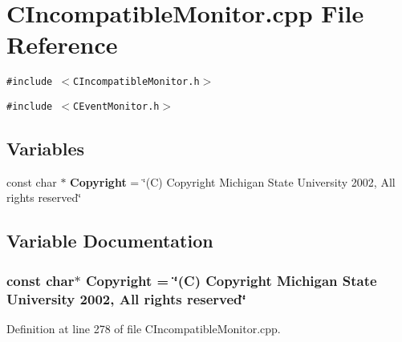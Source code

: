 \section{CIncompatible\-Monitor.cpp File Reference}
\label{CIncompatibleMonitor_8cpp}
{\tt \#include $<$CIncompatible\-Monitor.h$>$}\par
{\tt \#include $<$CEvent\-Monitor.h$>$}\par
\subsection*{Variables}
\begin{CompactItemize}
\item 
const char $\ast$ {\bf Copyright} = \char`\"{}(C) Copyright Michigan State University 2002, All rights reserved\char`\"{}
\end{CompactItemize}


\subsection{Variable Documentation}
\subsubsection{\setlength{\rightskip}{0pt plus 5cm}const char$\ast$ Copyright = \char`\"{}(C) Copyright Michigan State University 2002, All rights reserved\char`\"{}\hspace{0.3cm}{\tt  [static]}}\label{CIncompatibleMonitor_8cpp_a0}




Definition at line 278 of file CIncompatible\-Monitor.cpp.